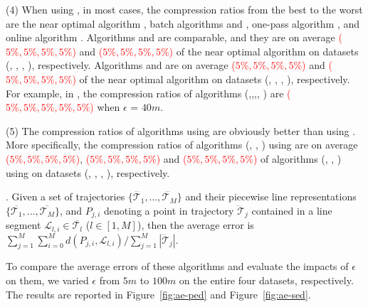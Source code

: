 \sstab (4) When using \sed, in most cases, the compression ratios from the best to the worst are the near optimal algorithm \nopts, batch algorithms \tpa and \dpa, one-pass algorithm \cised, and online algorithm \squishe. Algorithms \tpa and \dpa are comparable, and they are on average \textcolor{red}{($5\%,5\%,5\%,5\%$)} and \textcolor{red}{($5\%,5\%,5\%,5\%$)} of the near optimal algorithm \nopts on datasets (\ucar, \geolife, \mopsi, \act), respectively. Algorithms \cised and \squishe are on average \textcolor{red}{($5\%,5\%,5\%,5\%$)} and \textcolor{red}{($5\%,5\%,5\%,5\%$)} of the near optimal algorithm \nopts on datasets (\ucar, \geolife, \mopsi, \act), respectively.
For example, in \mopsi, the compression ratios of algorithms (\nopts,\tpa,\dpa,\squishe, \cised) are \textcolor{red}{($5\%, 5\%,5\%,5\%,5\%$)} when $\epsilon$ = $40m$.

\sstab (5) The compression ratios of algorithms using \ped are obviously better than using \sed. More specifically, the compression ratios of algorithms (\optp, \tpa, \dpa) using \ped are on average \textcolor{red}{($5\%,5\%,5\%,5\%$)}, \textcolor{red}{($5\%,5\%,5\%,5\%$)} and \textcolor{red}{($5\%,5\%,5\%,5\%$)} of algorithms (\nopts, \tpa, \dpa) using \sed on datasets (\ucar, \geolife, \mopsi, \act), respectively.
	





.
Given a set of trajectories $\{\dddot{\mathcal{T}_1}, \ldots, \dddot{\mathcal{T}_M}\}$ and their piecewise line representations
$\{\overline{\mathcal{T}_1}, \ldots, \overline{\mathcal{T}_M}\}$, and $P_{j,i}$ denoting
a point in trajectory $\dddot{\mathcal{T}}_j$ contained in a line segment $\mathcal{L}_{l,i}\in\overline{\mathcal{T}_l}$ ($l\in[1,M]$),
then the average error is $\sum_{j=1}^{M}\sum_{i=0}^{M} d(P_{j,i},
\mathcal{L}_{l,i})/\sum_{j=1}^{M}{|\dddot{\mathcal{T}}_j |}$.

To compare the average errors of these algorithms and evaluate the impacts of $\epsilon$ on them, we varied $\epsilon$ from $5m$ to $100m$ on the entire four datasets, respectively.
The results are reported in Figure~\ref{fig:ae-ped} and Figure~\ref{fig:ae-sed}.


